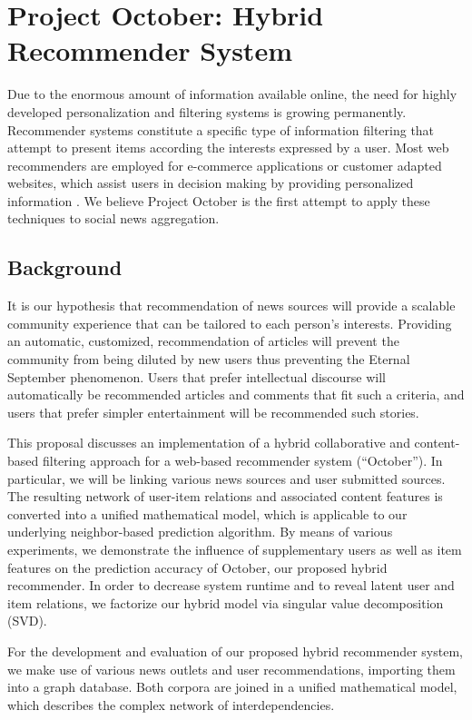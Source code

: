 \documentclass[11pt,letterpaper]{article}
\begin{document}
\newpage


\section{Project October: Hybrid Recommender System}

Due to the enormous amount of information available online, the need for highly developed personalization and filtering systems is growing permanently.
Recommender systems constitute a specific type of information filtering that attempt to present items according the interests expressed by a user\cite{1}.
Most web recommenders are employed for e-commerce applications or customer adapted websites, which assist users in decision making by providing personalized information \cite{5}.
We believe Project October is the first attempt to apply these techniques to social news aggregation.

\subsection{Background}
It is our hypothesis that recommendation of news sources will provide a scalable community experience that can be tailored to each person's interests.
Providing an automatic, customized, recommendation of articles will prevent the community from being diluted by new users thus preventing the Eternal September phenomenon. %
Users that prefer intellectual discourse will automatically be recommended articles and comments that fit such a criteria, and users that prefer simpler entertainment will be recommended such stories.

This proposal discusses an implementation of a hybrid collaborative and content-based filtering approach for a web-based recommender system (``October'').
In particular, we will be linking various news sources and user submitted sources.
The resulting network of user-item relations and associated content features is converted into a unified mathematical model, which is applicable to our underlying neighbor-based prediction algorithm.
By means of various experiments, we demonstrate the influence of supplementary users as well as item features on the prediction accuracy of October, our proposed hybrid recommender. In order to decrease system runtime and to reveal latent user and item relations, we factorize our hybrid model via singular value decomposition (SVD).

For the development and evaluation of our proposed hybrid recommender system, we make use of various news outlets and user recommendations, importing them into a graph database.
Both corpora are joined in a unified mathematical model, which describes the complex network of interdependencies.
\end{document}
